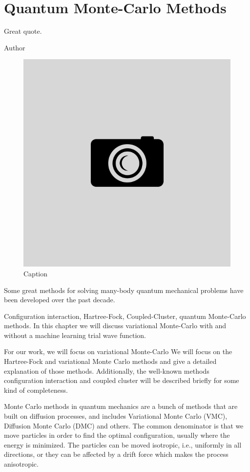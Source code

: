 \chapter{Quantum Monte-Carlo Methods} \label{chp:methods}
\epigraph{Great quote.}{Author}
\begin{figure}[H]
	\centering
	\includegraphics[scale=0.4]{Images/example.png}
	\caption{Caption}
\end{figure}

Some great methods for solving many-body quantum mechanical problems have been developed over the past decade. 

Configuration interaction, Hartree-Fock, Coupled-Cluster, quantum Monte-Carlo methods. In this chapter we will discuss variational Monte-Carlo with and without a machine learning trial wave function.

For our work, we will focus on variational Monte-Carlo 
We will focus on the Hartree-Fock and variational Monte Carlo methods and give a detailed explanation of those methods. Additionally, the well-known methods configuration interaction and coupled cluster will be described briefly for some kind of completeness. 

Monte Carlo methods in quantum mechanics are a bunch of methods that are built on diffusion processes, and includes Variational Monte Carlo (VMC), Diffusion Monte Carlo (DMC) and others. The common denominator is that we move particles in order to find the optimal configuration, usually where the energy is minimized. The particles can be moved isotropic, i.e., uniformly in all directions, or they can be affected by a drift force which makes the process anisotropic. 

